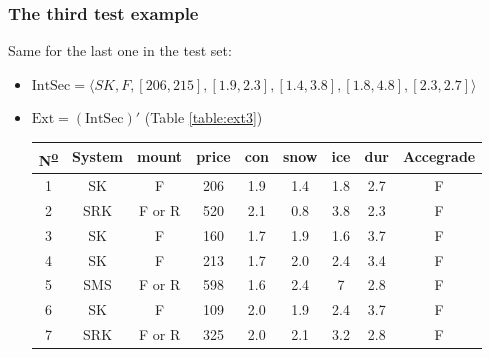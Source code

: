 \documentclass[12pt]{report}
\begin{document}
\begin{solution}
\begin{enumerate}
        \subsubsection*{The third test example}
        Same for the last one in the test set:
        \begin{itemize}
            \item $\text{IntSec} = \langle SK, F, [206, 215], [1.9, 2.3], [1.4, 3.8], [1.8, 4.8], [2.3, 2.7]\rangle$
            \item $\text{Ext} = (\text{IntSec})'$ (Table \ref{table:ext3})
            \begin{table}[H]
                \centering
                \begin{tabular}{|c|c|c|c|c|c|c|c|c|}
                \hline
                N\textsuperscript{\underline{o}} & System                      & mount  & price                       & con                         & snow & ice & dur & Accegrade \\ \hline
                \rowcolor[HTML]{34FF34} 
                1  & SK                          & F      & 206                         & 1.9                         & 1.4  & 1.8 & 2.7 & F         \\ \hline
                2 &
                  \cellcolor[HTML]{FE0000}SRK &
                  \cellcolor[HTML]{FFFFFF}F or R &
                  520 &
                  2.1 &
                  0.8 &
                  3.8 &
                  2.3 &
                  F \\ \hline
                3  & SK                          & F      & \cellcolor[HTML]{FE0000}160 & \cellcolor[HTML]{FFFFFF}1.7 & 1.9  & 1.6 & 3.7 & F         \\ \hline
                4  & SK                          & F      & \cellcolor[HTML]{FFFFFF}213 & \cellcolor[HTML]{FE0000}1.7 & 2.0  & 2.4 & 3.4 & F         \\ \hline
                5 &
                  \cellcolor[HTML]{FE0000}SMS &
                  F or R &
                  \cellcolor[HTML]{FFFFFF}598 &
                  1.6 &
                  2.4 &
                  7 &
                  2.8 &
                  F \\ \hline
                \rowcolor[HTML]{FFFFFF} 
                6  & SK                          & F      & \cellcolor[HTML]{FE0000}109 & 2.0                         & 1.9  & 2.4 & 3.7 & F         \\ \hline
                7  & \cellcolor[HTML]{FE0000}SRK & F or R & 325                         & 2.0                         & 2.1  & 3.2 & 2.8 & F         \\ \hline

\end{tabular}
\end{table}
\end{itemize}
\end{enumerate}
\end{solution}
\end{document}
